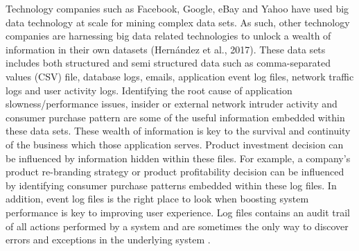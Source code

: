 \documentclass[12pt, letterpaper, titlepage]{report}
\begin{document}
Technology companies such as Facebook, Google, eBay and Yahoo have used big data technology at scale for mining complex data sets. As such, other technology companies are harnessing big data related technologies to unlock a wealth of information in their own datasets (Hernández et al., 2017). These data sets includes both structured and semi structured data such as comma-separated values (CSV) file, database logs, emails, application event log files, network traffic logs and user activity logs. Identifying the root cause of application slowness/performance issues, insider or external network intruder activity and consumer purchase pattern are some of the useful information embedded within these data sets. These wealth of information is key to the survival and continuity of the business which those application serves. Product investment decision can be influenced by information hidden within these files. For example, a company’s product re-branding strategy or product profitability decision can be influenced by identifying consumer purchase patterns embedded within these log files. In addition, event log files is the right place to look when boosting system performance is key to improving user experience. Log files contains an audit trail of all actions performed by a system and are sometimes the only way to discover errors and exceptions in the underlying system \citep{zwietasch2014detecting}. 
\end{document}
